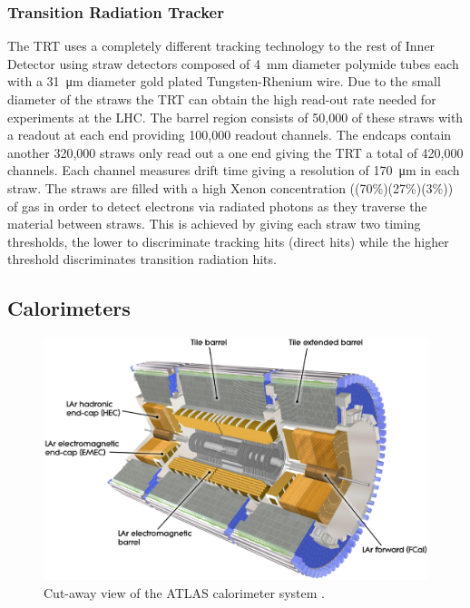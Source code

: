 		\subsubsection*{Transition Radiation Tracker}

		The TRT uses a completely different tracking technology to the rest of Inner Detector using straw detectors composed of 4~mm diameter polymide tubes each with a \SI{31}{\um} diameter gold plated Tungsten-Rhenium wire. Due to the small diameter of the straws the TRT can obtain the high read-out rate needed for experiments at the LHC. The barrel region consists of 50,000 of these straws with a readout at each end providing 100,000 readout channels. The endcaps contain another 320,000 straws only read out a one end giving the TRT a total of 420,000 channels. Each channel measures drift time giving a resolution of \SI{170}{\um} in each straw. The straws are filled with a high Xenon concentration ((70\%)(27\%)(3\%)) of gas in order to detect electrons via radiated photons as they traverse the material between straws. This is achieved by giving each straw two timing thresholds, the lower to discriminate tracking hits (direct hits) while the higher threshold discriminates transition radiation hits.  %
		



	\subsection{Calorimeters}

		\begin{figure}[h!]
			\begin{center}
				\includegraphics[width=0.95\linewidth]{images/Calorimeter_d3.eps}
			\end{center}
			\caption{Cut-away view of the ATLAS calorimeter system \cite{Aad:1129811}.}
			\label{fig:ATLAS_calo}
		\end{figure}

